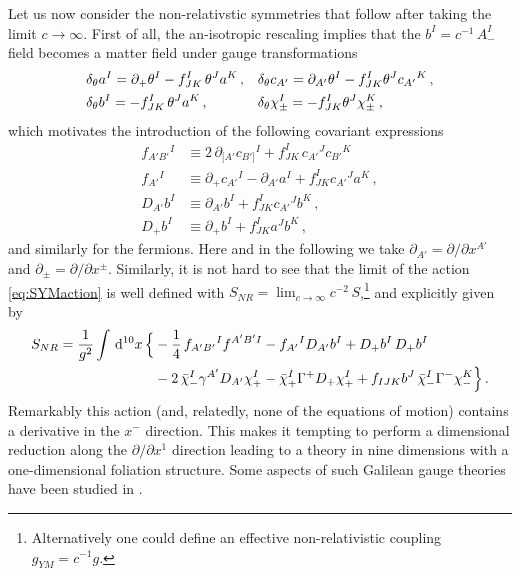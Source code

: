\documentclass[a4paper,10pt,openany]{article}
\def\rmd{\mathrm{d}}
\begin{document}
	Let us now consider the non-relativstic symmetries that follow after taking the limit $c\to\infty$. First of all, the an-isotropic rescaling implies that the $b^I = c^{-1}\,A_-^I$ field becomes a matter field under gauge transformations
	\begin{align}\label{eq:nrymtrafo}
		&\delta_\theta a^I = \partial_+\theta^I - f_{JK}^I \,\theta^J a^K\,, && \delta_\theta c_{A'} = \partial_{A'}\theta^I - f_{JK}^I\theta^J c_{A'}{}^K\,,\notag\\
		&\delta_\theta b^I =  -f_{JK}^I \,\theta^J a^K\,, && \delta_\theta \chi_\pm^I = -f^I_{JK}\theta^J\chi_\pm^K\,,
	\end{align}
	which motivates the introduction of the following covariant expressions
	\begin{subequations}
		\begin{align}
			f_{A'B'}{}^I &\equiv 2\,\partial_{[A'}c_{B']}{}^I + f_{JK}^I\,c_{A'}{}^J c_{B'}{}^K\\
			f_{A'}{}^I &\equiv \partial_+ c_{A'}{}^I - \partial_{A'} a^I + f_{JK}^Ic_{A'}{}^J a^K\,,\\
			D_{A'} b^I &\equiv \partial_{A'} b^I +f_{JK}^Ic_{A'}{}^J b^K\,,\\
			D_+ b^I &\equiv \partial_+ b^I + f_{JK}^I a^J b^K\,,
		\end{align}
	\end{subequations}
	and similarly for the fermions. Here and in the following we take $\partial_{A'}=\partial/\partial x^{A'}$ and $\partial_\pm = \partial/\partial x^\pm$. Similarly, it is not hard to see that the limit of the action \eqref{eq:SYMaction} is well defined with $S_{NR}=\lim_{c\to\infty} c^{-2}\,S$,\footnote{Alternatively one could define an effective non-relativistic coupling $g_{YM}=c^{-1}g$.} and explicitly given by
	\begin{align}\label{eq:NRSYM}
		S_{NR} = \frac{1}{g^2}\int\,\rmd^{10} x\,\Big\{&-\frac14\,f_{A'B'}{}^If^{A'B'I} -f_{A'}{}^I D_{A'}b^I + D_+b^I\,D_+b^I\notag\\
		&-2\,\bar\chi_-^I\gamma^{A'}D_{A'}\chi_+^I - \bar\chi_+^I\Gamma^+D_+\chi_+^I + f_{IJK}b^J\,\bar\chi_-^I\Gamma^-\chi_-^K\Big\}\,.
	\end{align}
	Remarkably this action (and, relatedly, none of the equations of motion) contains a derivative in the $x^-$ direction. This makes it tempting to perform a dimensional reduction along the $\partial/\partial x^1$ direction leading to a theory in nine dimensions with a one-dimensional foliation structure. Some aspects of such Galilean gauge theories have been studied in \cite{Bergshoeff:2015sic, Festuccia:2016caf,Gomis:2020fui,Chapman:2020vtn,Lambert:2019jwi}. \\
\end{document}
